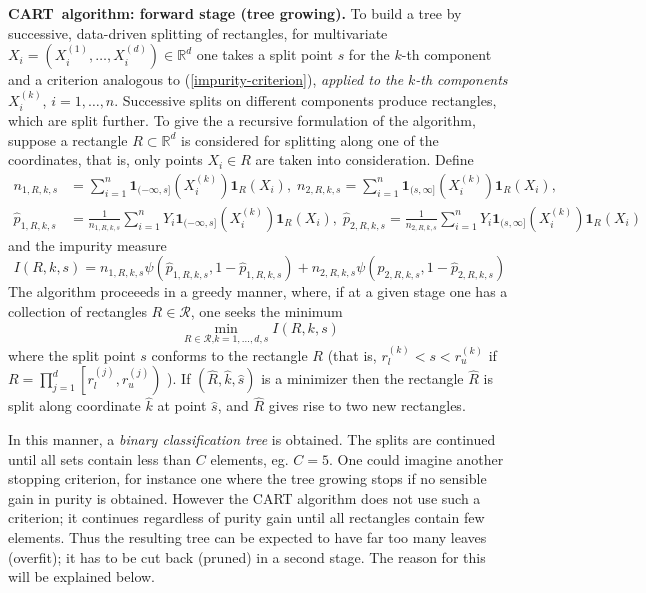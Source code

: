 \documentclass[11pt,twoside]{article}%
\theoremstyle{change}
\begin{document}
\bigskip

\textbf{CART\ algorithm: forward stage (tree growing). }To build a tree by
successive, data-driven splitting of rectangles, for multivariate
$X_{i}=(X_{i}^{(1)},\ldots,X_{i}^{(d)})\in\mathbb{R}^{d}$ one takes a split
point $s$ for the $k$-th component and a criterion analogous to
(\ref{impurity-criterion}), \textit{applied to the }$k$\textit{-th components
}$X_{i}^{(k)}$, $i=1,\ldots,n$. Successive splits on different components
produce rectangles, which are split further. To give the a recursive
formulation of the algorithm, suppose a rectangle $R\subset\mathbb{R}^{d}$ is
considered for splitting along one of the coordinates, that is, only points
$X_{i}\in R$ are taken into consideration. Define
\begin{align}
n_{1,R,k,s}  & =\sum_{i=1}^{n}\mathbf{1}_{(-\infty,s]}(X_{i}^{(k)}%
)\mathbf{1}_{R}(X_{i}),\;n_{2,R,k,s}=\sum_{i=1}^{n}\mathbf{1}_{(s,\infty
]}(X_{i}^{(k)})\mathbf{1}_{R}(X_{i}),\label{unweighted-multi-1}\\
\hat{p}_{1,R,k,s}  & =\frac{1}{n_{1,R,k,s}}\sum_{i=1}^{n}Y_{i}\mathbf{1}%
_{(-\infty,s]}(X_{i}^{(k)})\mathbf{1}_{R}(X_{i}),\;\hat{p}_{2,R,k,s}=\frac
{1}{n_{2,R,k,s}}\sum_{i=1}^{n}Y_{i}\mathbf{1}_{(s,\infty]}(X_{i}%
^{(k)})\mathbf{1}_{R}(X_{i})\label{unweighted-multi-2}%
\end{align}
and the impurity measure
\begin{equation}
I(R,k,s)=n_{1,R,k,s}\psi\left(  \hat{p}_{1,R,k,s},1-\hat{p}_{1,R,k,s}\right)
+n_{2,R,k,s}\psi\left(  \hat{p}_{2,R,k,s},1-\hat{p}_{2,R,k,s}\right)
\label{impurity-rectangle}%
\end{equation}
The algorithm proceeeds in a greedy manner, where, if at a given stage one has
a collection of rectangles $R\in\mathcal{R}$, one seeks the minimum
\[
\min_{R\in\mathcal{R}\text{,}k=1,\ldots,d,s}I(R,k,s)
\]
where the split point $s$ conforms to the rectangle $R$ (that is, $r_{l}%
^{(k)}<s<r_{u}^{(k)}$ if $R=%
{\displaystyle\prod\limits_{j=1}^{d}}
\left[  r_{l}^{(j)},r_{u}^{(j)}\right)  $ ). If $\left(  \hat{R},\hat{k}%
,\hat{s}\right)  $ is a minimizer then the rectangle $\hat{R}$ is split along
coordinate $\hat{k}$ at point $\hat{s}$, and $\hat{R}$ gives rise to two new rectangles.

In this manner, a \textit{binary classification tree} is obtained. The splits
are continued until all sets contain less than $C$ elements, eg. $C=5$. One
could imagine another stopping criterion, for instance one where the tree
growing stops if no sensible gain in purity is obtained. However the CART
algorithm does not use such a criterion; it continues regardless of purity
gain until all rectangles contain few elements. Thus the resulting tree can be
expected to have far too many leaves (overfit); it has to be cut back (pruned)
in a second stage. The reason for this will be explained below.
\end{document}
